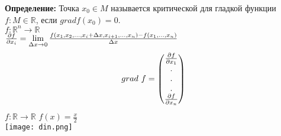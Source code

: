 \documentclass[12pt,a4paper]{article}
\begin{document}
\textbf{Определение: } Точка \(x_0\in M\) называется критической для гладкой функции \(f: M \in \mathbb{R}\), если \(grad f(x_0)=0\).\\
\(f:\mathbb{R}^n \to \mathbb{R}\)\\
\({\partial f\over {\partial x_i}} = \lim \limits_{\Delta x\to 0}\frac{f(x_1,x_2,...,x_i +\Delta x,x_{i+1},...,x_n)-f(x_1,...,x_n)}{\Delta x}\)
\begin{equation*}
grad\ f= 
\begin{pmatrix}
\partial f\over {\partial x_1}\\
.\\
.\\
.\\
\partial f\over {\partial x_n}
\end{pmatrix}
\end{equation*}
\(f: \mathbb{R}\to \mathbb{R}\)
\(f(x)=\frac{x}{2}\)\\
\texttt{[image: din.png]}
\end{document}
